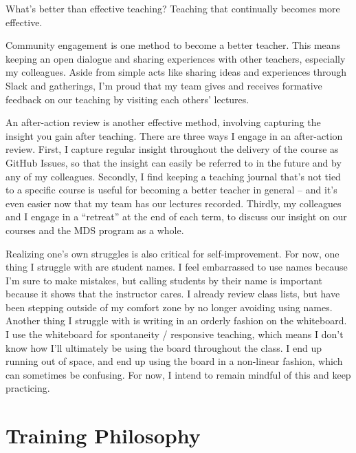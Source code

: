 \documentclass[]{book}
\begin{document}
What's better than effective teaching? Teaching that continually becomes more effective.

Community engagement is one method to become a better teacher. This means keeping an open dialogue and sharing experiences with other teachers, especially my colleagues. Aside from simple acts like sharing ideas and experiences through Slack and gatherings, I'm proud that my team gives and receives formative feedback on our teaching by visiting each others' lectures.

An after-action review is another effective method, involving capturing the insight you gain after teaching. There are three ways I engage in an after-action review. First, I capture regular insight throughout the delivery of the course as GitHub Issues, so that the insight can easily be referred to in the future and by any of my colleagues. Secondly, I find keeping a teaching journal that's not tied to a specific course is useful for becoming a better teacher in general -- and it's even easier now that my team has our lectures recorded. Thirdly, my colleagues and I engage in a ``retreat'' at the end of each term, to discuss our insight on our courses and the MDS program as a whole.

Realizing one's own struggles is also critical for self-improvement. For now, one thing I struggle with are student names. I feel embarrassed to use names because I'm sure to make mistakes, but calling students by their name is important because it shows that the instructor cares. I already review class lists, but have been stepping outside of my comfort zone by no longer avoiding using names. Another thing I struggle with is writing in an orderly fashion on the whiteboard. I use the whiteboard for spontaneity / responsive teaching, which means I don't know how I'll ultimately be using the board throughout the class. I end up running out of space, and end up using the board in a non-linear fashion, which can sometimes be confusing. For now, I intend to remain mindful of this and keep practicing.

\hypertarget{training-philosophy}{%
\section{Training Philosophy}\label{training-philosophy}}
\end{document}
